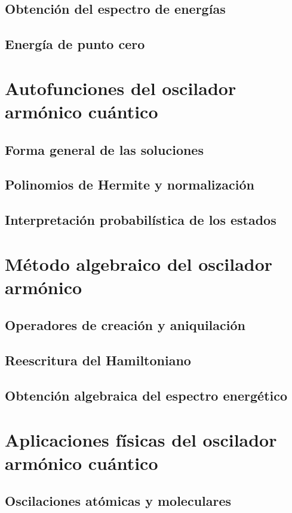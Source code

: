 \documentclass[11pt,a4paper,spanish]{book}
\begin{document}
\subsection{Obtención del espectro de energías}
\subsection{Energía de punto cero}

\section{Autofunciones del oscilador armónico cuántico}
\subsection{Forma general de las soluciones}
\subsection{Polinomios de Hermite y normalización}
\subsection{Interpretación probabilística de los estados}

\section{Método algebraico del oscilador armónico}
\subsection{Operadores de creación y aniquilación}
\subsection{Reescritura del Hamiltoniano}
\subsection{Obtención algebraica del espectro energético}

\section{Aplicaciones físicas del oscilador armónico cuántico}
\subsection{Oscilaciones atómicas y moleculares}
\end{document}
